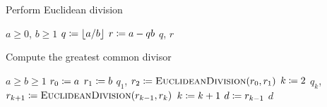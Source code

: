 \begin{algorithm}[t]
\caption[Euclidean Division]{Perform Euclidean division}
\label{alg:euclidean_div}
\begin{algorithmic}[1]
\Require $a\ge 0$, $b\ge 1$
    \State $q \coloneqq{} \lfloor a/b\rfloor$
    \State $r \coloneqq{} a - qb$
    \State \Return $q$, $r$
\EndProcedure
\end{algorithmic}

\end{algorithm}
\begin{algorithm}[t]
\caption[Euclidean Algorithm]{Compute the greatest common divisor}
\label{alg:euclidean_alg}
\begin{algorithmic}[1]
\Require $a\ge b\ge 1$
    \State $r_{0} \coloneqq{} a$
    \State $r_{1} \coloneqq{} b$
    \State $q_{1}$, $r_{2} \coloneqq{} \textsc{EuclideanDivision}(r_{0},r_{1})$
    \State $k \coloneqq{} 2$
        \State $q_{k}$, $r_{k+1} \coloneqq{}
            \textsc{EuclideanDivision}(r_{k-1},r_{k})$
        \State $k \coloneqq{} k+1$
    \EndWhile
    \State $d \coloneqq{} r_{k-1}$
    \State \Return $d$
\EndProcedure
\end{algorithmic}
\end{algorithm}
